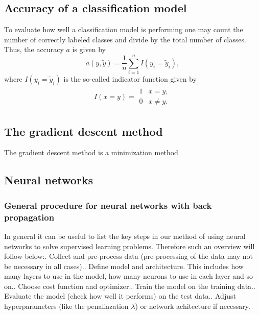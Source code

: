\documentclass[a4paper,12pt]{article}
\begin{document}
\subsection{Accuracy of a classification model}
To evaluate how well a classification model is performing one may count the number of correctly labeled classes and divide by the total number of classes. Thus, the accuracy $a$ is given by
\begin{equation}
    a(y,\tilde{y}) = \frac{1}{n}\sum_{i=1}^n I(y_i = \tilde{y}_i),
\end{equation}
where $I(y_i = \tilde{y}_i)$ is the so-called indicator function given by
\begin{align}
    I(x = y) = \begin{array}{cc}
    1 & x = y, \\
    0 & x \neq y.
    \end{array}
\end{align}


\subsection{The gradient descent method}
The gradient descent method is a minimization method

\subsection{Neural networks}

\subsubsection{General procedure for neural networks with back propagation}
In general it can be useful to list the key steps in our method of using neural networks to solve supervised learning problems. Therefore such an overview will follow below:. Collect and pre-process data (pre-processing of the data may not be necessary in all cases).. Define model and architecture. This includes how many layers to use in the model, how many neurons to use in each layer and so on.. Choose cost function and optimizer.. Train the model on the training data.. Evaluate the model (check how well it performs) on the test data.. Adjust hyperparameters (like the penaliazation $\lambda$) or network achitecture if necessary.
\end{document}
